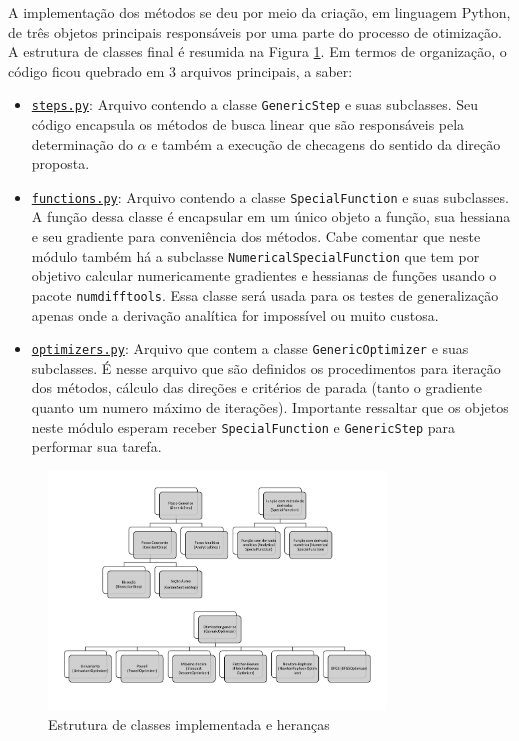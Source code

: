 \documentclass[10pt, a4paper]{article}
\begin{document}
A implementação dos métodos se deu por meio da criação, em linguagem Python, de três objetos principais responsáveis por uma
parte do processo de otimização. A estrutura de classes final é resumida na Figura \ref{fig:classes}. Em termos de organização,
o código ficou quebrado em 3 arquivos principais, a saber:

\begin{itemize}
  \item {\tt \href{https://github.com/prj-phcp/MEC2403_Activities/blob/master/packages/steps.py}{steps.py}}: Arquivo contendo a classe {\tt GenericStep} 
  e suas subclasses. Seu código encapsula os métodos de busca linear que são responsáveis pela determinação do $\alpha$ e também a execução de checagens
  do sentido da direção proposta.
  \item {\tt \href{https://github.com/prj-phcp/MEC2403_Activities/blob/master/packages/functions.py}{functions.py}}: Arquivo contendo a classe {\tt SpecialFunction}
  e suas subclasses. A função dessa classe é encapsular em um único objeto a função, sua hessiana e seu gradiente para conveniência dos métodos. Cabe comentar que
  neste módulo também há a subclasse {\tt NumericalSpecialFunction} que tem por objetivo calcular numericamente gradientes e hessianas de funções usando o pacote 
  {\tt numdifftools}. Essa classe será usada para os testes de generalização apenas onde a derivação analítica for impossível ou muito custosa. 
  \item {\tt \href{https://github.com/prj-phcp/MEC2403_Activities/blob/master/packages/optimizers.py}{optimizers.py}}: Arquivo que contem a classe {\tt GenericOptimizer}
  e suas subclasses. É nesse arquivo que são definidos os procedimentos para iteração dos métodos, cálculo das direções e critérios de parada (tanto o gradiente quanto um
  numero máximo de iterações). Importante ressaltar que os objetos neste módulo esperam receber {\tt SpecialFunction} e {\tt GenericStep} para performar sua tarefa.
\end{itemize}

\begin{figure}[htpb]
  \centering
  \includegraphics[width=0.8\textwidth]{../general/classes_full.pdf}
  \caption{Estrutura de classes implementada e heranças}
  \label{fig:classes}
\end{figure}
\end{document}
